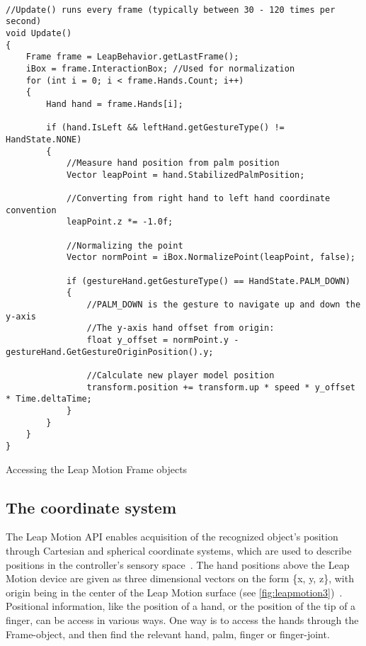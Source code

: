 \begin{table}
\label{table:annotation_visibility_code}
\lstset{style=csharp}
\begin{lstlisting}

//Update() runs every frame (typically between 30 - 120 times per second)
void Update()
{
    Frame frame = LeapBehavior.getLastFrame();
    iBox = frame.InteractionBox; //Used for normalization
    for (int i = 0; i < frame.Hands.Count; i++)
    {
        Hand hand = frame.Hands[i]; 

        if (hand.IsLeft && leftHand.getGestureType() != HandState.NONE)
        {
            //Measure hand position from palm position
            Vector leapPoint = hand.StabilizedPalmPosition;
            
            //Converting from right hand to left hand coordinate convention
            leapPoint.z *= -1.0f; 

            //Normalizing the point
            Vector normPoint = iBox.NormalizePoint(leapPoint, false);
            
            if (gestureHand.getGestureType() == HandState.PALM_DOWN) 
            {
                //PALM_DOWN is the gesture to navigate up and down the y-axis          
                //The y-axis hand offset from origin:
                float y_offset = normPoint.y - gestureHand.GetGestureOriginPosition().y;

                //Calculate new player model position
                transform.position += transform.up * speed * y_offset * Time.deltaTime;
            }             
        }
    }
}
\end{lstlisting}
\caption[Accessing the Leap Motion Frame objects]{Accessing the Leap Motion Frame objects}
\end{table}

\subsection{The coordinate system}
The Leap Motion API enables acquisition of the recognized object's position through Cartesian and spherical coordinate systems, 
which are used to describe positions in the controller's sensory space~\citep{Guna2014}. The hand positions above the Leap Motion device are given as three dimensional
vectors on the form \{x, y, z\}, with origin being in the center of the Leap Motion surface (see \ref{fig:leapmotion3})~\citep{LeapMotion2016}.  
Positional information, like the position of a hand, or the position of the tip of a finger, can be access in various ways. One way is to access the hands through the
Frame-object, and then find the relevant hand, palm, finger or finger-joint.


